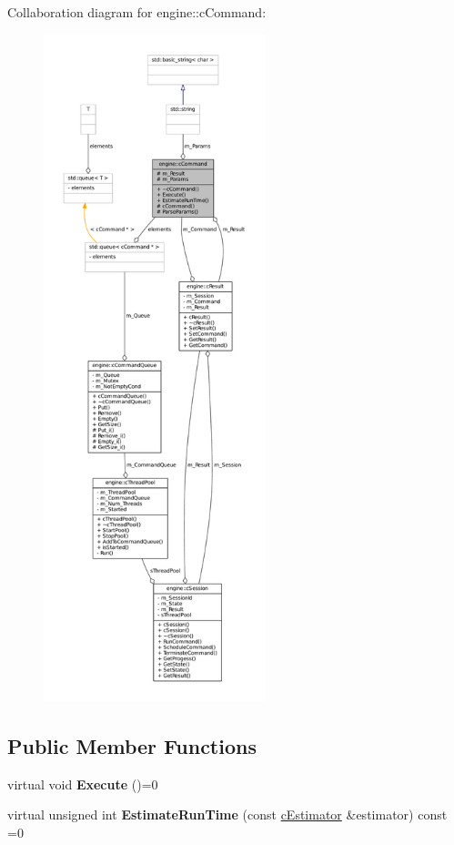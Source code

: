 \-Collaboration diagram for engine\-:\-:c\-Command\-:\nopagebreak
\begin{figure}[H]
\begin{center}
\leavevmode
\includegraphics[height=550pt]{classengine_1_1cCommand__coll__graph}
\end{center}
\end{figure}
\subsection*{\-Public \-Member \-Functions}
\begin{DoxyCompactItemize}
\item 
\hypertarget{classengine_1_1cCommand_a4c84c161b94f6ae36aec3661f951b54f}{
virtual void {\bfseries \-Execute} ()=0}
\label{classengine_1_1cCommand_a4c84c161b94f6ae36aec3661f951b54f}

\item 
\hypertarget{classengine_1_1cCommand_a8b5b45ad34530c454722a44e41ce9e78}{
virtual unsigned int {\bfseries \-Estimate\-Run\-Time} (const \hyperlink{classengine_1_1cEstimator}{c\-Estimator} \&estimator) const =0}
\label{classengine_1_1cCommand_a8b5b45ad34530c454722a44e41ce9e78}

\end{DoxyCompactItemize}
